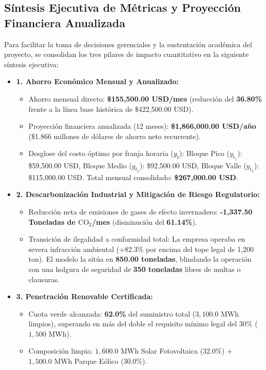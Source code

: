 \documentclass[11pt,a4paper]{article}
\begin{document}
\subsection{Síntesis Ejecutiva de Métricas y Proyección Financiera Anualizada}
Para facilitar la toma de decisiones gerenciales y la sustentación académica del proyecto, se consolidan los tres pilares de impacto cuantitativo en la siguiente síntesis ejecutiva:

\begin{tcolorbox}[colback=lightgray, colframe=primary, arc=3mm, title=\textbf{Síntesis Cuantitativa de Impacto: Las Tres Cifras de Oro}]
\begin{itemize}
    \item \textbf{1. Ahorro Económico Mensual y Anualizado:} 
    \begin{itemize}
        \item Ahorro mensual directo: \textbf{\$155,500.00 USD/mes} (reducción del \textbf{36.80\%} frente a la línea base histórica de \$422,500.00 USD).
        \item Proyección financiera anualizada (12 meses): \textbf{\$1,866,000.00 USD/año} (\$1.866 millones de dólares de ahorro neto recurrente).
        \item Desglose del costo óptimo por franja horaria ($y_t$): Bloque Pico ($y_{t_1}$): \$59,500.00 USD, Bloque Medio ($y_{t_2}$): \$92,500.00 USD, Bloque Valle ($y_{t_3}$): \$115,000.00 USD. Total mensual consolidado: \textbf{\$267,000.00 USD}.
    \end{itemize}
    \item \textbf{2. Descarbonización Industrial y Mitigación de Riesgo Regulatorio:}
    \begin{itemize}
        \item Reducción neta de emisiones de gases de efecto invernadero: \textbf{-1,337.50 Toneladas de $\text{CO}_2$/mes} (disminución del \textbf{61.14\%}).
        \item Transición de ilegalidad a conformidad total: La empresa operaba en severa infracción ambiental (+82.3\% por encima del tope legal de 1,200 ton). El modelo la sitúa en \textbf{850.00 toneladas}, blindando la operación con una holgura de seguridad de \textbf{350 toneladas} libres de multas o clausuras.
    \end{itemize}
    \item \textbf{3. Penetración Renovable Certificada:}
    \begin{itemize}
        \item Cuota verde alcanzada: \textbf{62.0\%} del suministro total ($3,100.0\text{ MWh}$ limpios), superando en más del doble el requisito mínimo legal del 30\% ($1,500\text{ MWh}$).
        \item Composición limpia: $1,600.0\text{ MWh}$ Solar Fotovoltaica (32.0\%) + $1,500.0\text{ MWh}$ Parque Eólico (30.0\%).
    \end{itemize}
\end{itemize}
\end{tcolorbox}
\end{document}
